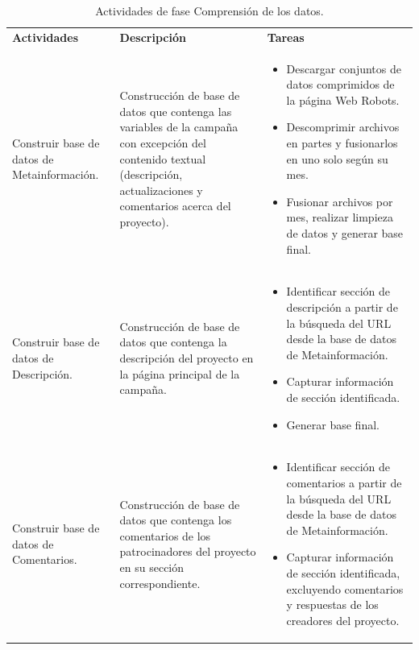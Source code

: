 \begin{longtable}{|M{4cm}|M{5.5cm}|M{5.5cm}|}
	\caption[Actividades de fase Comprensión de los datos]{Actividades de fase Comprensión de los datos.}
	\label{3:table4}
	\newcommand{\multirot}[1]{\multirow{2}{*}[-8ex]{\rotcell{\rlap{#1}}}}
	\footnotesize
	\centering
	\small
	\tabularnewline\hline
	\textbf{Actividades} & \textbf{Descripción} & \textbf{Tareas}
	\\
	\hline
	Construir base de datos de Metainformación.
	& Construcción de base de datos que contenga las variables de la campaña con excepción del contenido textual (descripción, actualizaciones y comentarios acerca del proyecto).
	& 
	\begin{itemize}[noitemsep,leftmargin=*]
		\item Descargar conjuntos de datos comprimidos de la página Web Robots.
		\item Descomprimir archivos en partes y fusionarlos en uno solo según su mes.
		\item Fusionar archivos por mes, realizar limpieza de datos y generar base final.
	\end{itemize} 
	\\
	\hline
	Construir base de datos de Descripción.
	& Construcción de base de datos que contenga la descripción del proyecto en la página principal de la campaña.
	& 
	\begin{itemize}[noitemsep,leftmargin=*]
		\item Identificar sección de descripción a partir de la búsqueda del URL desde la base de datos de Metainformación.
		\item Capturar información de sección identificada.
		\item Generar base final.
	\end{itemize} 
	\\
	\hline
	Construir base de datos de Comentarios.
	& Construcción de base de datos que contenga los comentarios de los patrocinadores del proyecto en su sección correspondiente.
	& 
	\begin{itemize}[noitemsep,leftmargin=*]
		\item Identificar sección de comentarios a partir de la búsqueda del URL desde la base de datos de Metainformación.
		\item Capturar información de sección identificada, excluyendo comentarios y respuestas de los creadores del proyecto.

\end{itemize}
\end{longtable}
